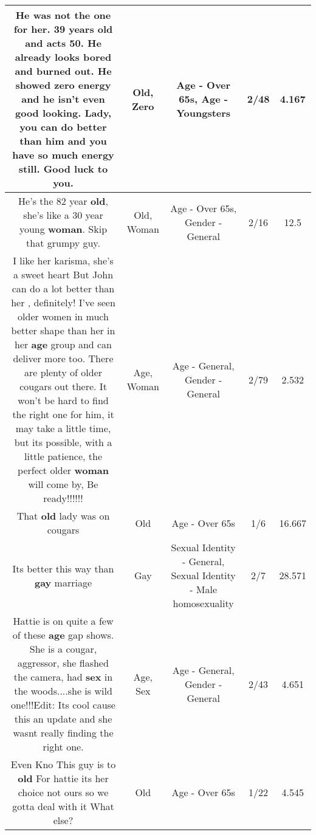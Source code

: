 \documentclass[11pt]{article}
\newlength\mylength
\begin{document}
\begin{center}
\begin{longtable}{|C{.65\mylength}|C{.30\mylength}|C{.12\mylength}|C{.12\mylength}|C{.12\mylength}|}
  \small He was not the one for her. 39 years \textbf{old} and acts 50. He already looks bored and burned out. He showed \textbf{zero} energy and he isn't even good looking. Lady, you can do better than him and you have so much energy still. Good luck to you.\normalsize   & Old, Zero & Age - Over 65s, Age - Youngsters & 2/48 & 4.167 \\  \hline
  \small He's the 82 year \textbf{old}, she's like a 30 year young \textbf{woman}. Skip that grumpy guy.\normalsize   & Old, Woman & Age - Over 65s, Gender - General & 2/16 & 12.5 \\  \hline
  \small I like her karisma, she's a sweet heart But John can do a lot better than her , definitely! I've seen older women in much better shape than her in her \textbf{age} group and can deliver more too. There are plenty of older cougars out there. It won't be hard to find the right one for him, it may take a little time, but its possible, with a little patience, the perfect older \textbf{woman} will come by, Be ready!!!!!!\normalsize   & Age, Woman & Age - General, Gender - General & 2/79 & 2.532 \\  \hline
  \small That \textbf{old} lady was on cougars\normalsize   & Old & Age - Over 65s & 1/6 & 16.667 \\  \hline
  \small Its better this way than  \textbf{g\textbf{ay}} marriage\normalsize   & Gay & Sexual Identity - General, Sexual Identity - Male homosexuality & 2/7 & 28.571 \\  \hline
  \small Hattie is on quite a few of these \textbf{age} gap shows. She is a cougar, aggressor, she flashed the camera, had \textbf{sex} in the woods....she is wild one!!!Edit: Its cool cause this an update and she wasnt really finding the right one.\normalsize   & Age, Sex & Age - General, Gender - General & 2/43 & 4.651 \\  \hline
  \small Even Kno This guy is to \textbf{old} For hattie its her choice not ours so we gotta deal with it What else?\normalsize   & Old & Age - Over 65s & 1/22 & 4.545 \\  \hline

\end{longtable}
\end{center}
\end{document}
